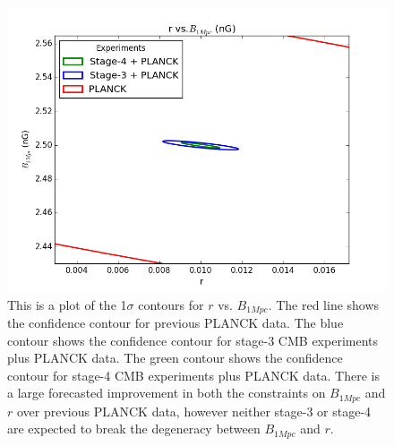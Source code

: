 \begin{figure}[h]
\centering
\includegraphics[scale=0.85]{images/contours/52.png}
\caption{This is a plot of the 1$\sigma$ contours for $r$ vs. $B_{1Mpc}$. The red line shows the confidence contour for previous PLANCK data. The blue contour shows the confidence contour for stage-3 CMB experiments plus PLANCK data. The green contour shows the confidence contour for stage-4 CMB experiments plus PLANCK data. There is a large forecasted improvement in both the constraints on $B_{1Mpc}$ and $r$ over previous PLANCK data, however neither stage-3 or stage-4 are expected to break the degeneracy between $B_{1Mpc}$ and $r$.}
\label{fig:r}
\end{figure}

